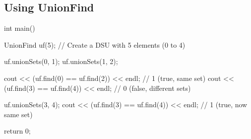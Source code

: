 \documentclass{report}
\begin{document}
\bigbreak \noindent 
\subsection{Using UnionFind}
\bigbreak \noindent 
\begin{cppcode}
    int main() {
        UnionFind uf(5); // Create a DSU with 5 elements (0 to 4)

        uf.unionSets(0, 1);
        uf.unionSets(1, 2);

        cout << (uf.find(0) == uf.find(2)) << endl; // 1 (true, same set)
        cout << (uf.find(3) == uf.find(4)) << endl; // 0 (false, different sets)

        uf.unionSets(3, 4);
        cout << (uf.find(3) == uf.find(4)) << endl; // 1 (true, now same set)

        return 0;
    }
\end{cppcode}


\pagebreak \bigbreak \noindent 
\end{document}
